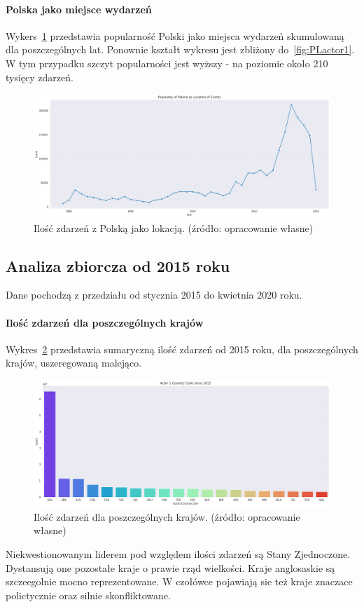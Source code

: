 \documentclass[11pt]{report}
\begin{document}
    \paragraph{Polska jako miejsce wydarzeń}
    Wykers~\ref{fig:PLlocation} przedstawia popularność Polski jako miejsca wydarzeń skumulowaną dla poszczególnych lat. Ponownie kształt wykresu jest zbliżony do~\ref{fig:PLactor1}. W tym przypadku szczyt popularności jest wyższy - na poziomie około 210 tysięcy zdarzeń.
    \begin{figure}[ht!]
        \centering
        \includegraphics[width=1 \textwidth]{fig/PL/PLlocation.png}
        \caption{Ilość zdarzeń z Polską jako lokacją. (źródło: opracowanie własne)}
        \label{fig:PLlocation}
    \end{figure}

    \subsection{Analiza zbiorcza od 2015 roku}
    Dane pochodzą z przedziału od stycznia 2015 do kwietnia 2020 roku.

    \paragraph{Ilość zdarzeń dla poszczególnych krajów}
    Wykres~\ref{fig:GLOBALactor1} przedstawia sumaryczną ilość zdarzeń od 2015 roku, dla poszczególnych krajów, uszeregowaną malejąco.
    \begin{figure}[ht!]
        \centering
        \includegraphics[width=1 \textwidth]{fig/GLOBAL/Actor1.png}
        \caption{Ilość zdarzeń dla poszczególnych krajów. (źródło: opracowanie własne)}
        \label{fig:GLOBALactor1}
    \end{figure}
    Niekwestionowanym liderem pod względem ilości zdarzeń są Stany Zjednoczone. Dystansują one pozostałe kraje o prawie rząd wielkości. Kraje anglosaskie są szczeegolnie mocno reprezentowane. W czołówce pojawiają sie też kraje znaczace polictycznie oraz silnie skonfliktowane.
\end{document}

